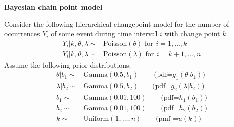 \documentclass[11pt]{article}
\begin{document}
\pagestyle{empty}
\begin{center}
\Large
{\bf  Bayesian chain point model}\\
\end{center}
\normalsize
Consider the following hierarchical changepoint model for the number
of occurrences $Y_i$ of some event during time interval $i$ with change point $k$.
\begin{equation*}
\begin{split}
Y_i |k,\theta,\lambda \sim & \mbox{Poisson}(\theta) \mbox{ for } i=1,\dots,k\\
Y_i |k,\theta,\lambda \sim & \mbox{Poisson}(\lambda) \mbox{ for } i=k+1,\dots,n
\end{split}
\end{equation*}
Assume the following prior distributions:
\begin{equation*}
\begin{split}
  \theta|b_1 \sim & \mbox{Gamma}(0.5,b_1)\:\:\:\:\:\:\:\:\:\:\mbox{(pdf=} g_1(\theta|b_1))\\
  \lambda|b_2 \sim &  \mbox{Gamma}(0.5,b_2)\:\:\:\:\:\:\:\:\: \mbox{(pdf=} g_2(\lambda|b_2))\\
  b_1 \sim & \mbox{Gamma}(0.01,100)\:\:\:\:\:\:\:\:\: \mbox{(pdf=} h_1(b_1))\\
  b_2 \sim & \mbox{Gamma}(0.01,100)\:\:\:\:\:\:\:\:\: \mbox{(pdf=} h_2(b_2))\\
  k \sim & \mbox{Uniform}(1,\dots,n)\:\:\:\:\:\:\:\:\: \mbox{(pmf =} u(k))
\end{split}
\end{equation*}
\end{document}
